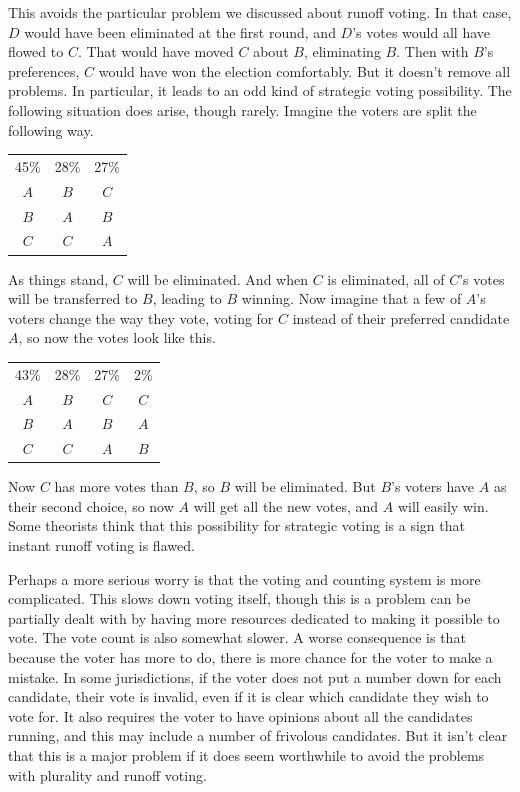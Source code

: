 \documentclass[openany]{book}
\begin{document}
This avoids the particular problem we discussed about runoff voting. In that case, $D$ would have been eliminated at the first round, and $D$'s votes would all have flowed to $C$. That would have moved $C$ about $B$, eliminating $B$. Then with $B$'s preferences, $C$ would have won the election comfortably. But it doesn't remove all problems. In particular, it leads to an odd kind of strategic voting possibility. The following situation does arise, though rarely. Imagine the voters are split the following way.
\begin{center}
\begin{tabular}{c c c}
45\% & 28\% &27\% \\
$A$ & $B$ & $C$ \\
$B$ & $A$ & $B$ \\
$C$ & $C$ & $A$
\end{tabular}
\end{center}
As things stand, $C$ will be eliminated. And when $C$ is eliminated, all of $C$'s votes will be transferred to $B$, leading to $B$ winning. Now imagine that a few of $A$'s voters change the way they vote, voting for $C$ instead of their preferred candidate $A$, so now the votes look like this.
\begin{center}
\begin{tabular}
{c c c c}
43\% & 28\% &27\% & 2\% \\ 
$A$ & $B$ & $C$ & $C$\\
$B$ & $A$ & $B$ & $A$ \\
$C$ & $C$ & $A$ & $B$
\end{tabular}
\end{center}
Now $C$ has more votes than $B$, so $B$ will be eliminated. But $B$'s voters have $A$ as their second choice, so now $A$ will get all the new votes, and $A$ will easily win. Some theorists think that this possibility for strategic voting is a sign that instant runoff voting is flawed.

Perhaps a more serious worry is that the voting and counting system is more complicated. This slows down voting itself, though this is a problem can be partially dealt with by having more resources dedicated to making it possible to vote. The vote count is also somewhat slower. A worse consequence is that because the voter has more to do, there is more chance for the voter to make a mistake. In some jurisdictions, if the voter does not put a number down for each candidate, their vote is invalid, even if it is clear which candidate they wish to vote for. It also requires the voter to have opinions about all the candidates running, and this may include a number of frivolous candidates. But it isn't clear that this is a major problem if it does seem worthwhile to avoid the problems with plurality and runoff voting.
\end{document}
